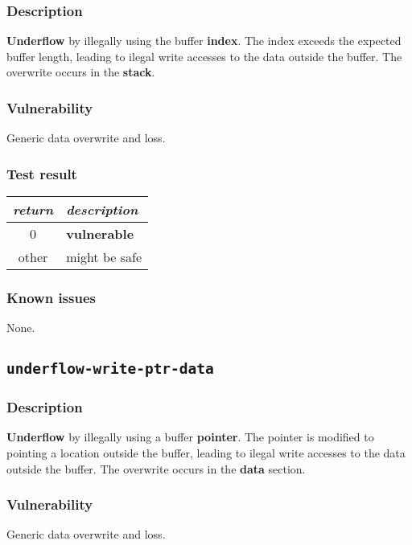 \documentclass[a4paper]{book}
\begin{document}
\subsubsection{Description}

\textbf{Underflow} by illegally using the buffer \textbf{index}.
The index exceeds the expected buffer length,
leading to ilegal write accesses to the data outside the buffer.
The overwrite occurs in the \textbf{stack}.

\subsubsection{Vulnerability}
Generic data overwrite and loss.

\subsubsection{Test result}
\begin{tabular}{cl}
  \toprule
  \emph{return}  & \emph{description} \\
  \midrule
  0              & \textbf{vulnerable} \\
  other          & might be safe \\
  \bottomrule
\end{tabular}

\subsubsection{Known issues}

None.

\newpage

\subsection{\texttt{underflow-write-ptr-data}}\label{test-underflow-write-ptr-data}

\subsubsection{Description}

\textbf{Underflow} by illegally using a buffer \textbf{pointer}.
The pointer is modified to pointing a location outside the buffer,
leading to ilegal write accesses to the data outside the buffer.
The overwrite occurs in the \textbf{data} section.

\subsubsection{Vulnerability}
Generic data overwrite and loss.
\end{document}
